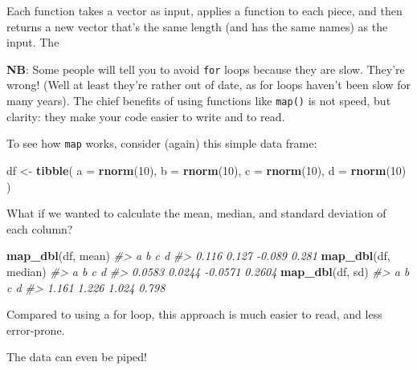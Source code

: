 \documentclass[]{book}
\newenvironment{Shaded}{\begin{snugshade}}{\end{snugshade}}
\newcommand{\KeywordTok}[1]{\textcolor[rgb]{0.13,0.29,0.53}{\textbf{#1}}}
\newcommand{\DataTypeTok}[1]{\textcolor[rgb]{0.13,0.29,0.53}{#1}}
\newcommand{\DecValTok}[1]{\textcolor[rgb]{0.00,0.00,0.81}{#1}}
\newcommand{\StringTok}[1]{\textcolor[rgb]{0.31,0.60,0.02}{#1}}
\newcommand{\CommentTok}[1]{\textcolor[rgb]{0.56,0.35,0.01}{\textit{#1}}}
\newcommand{\OperatorTok}[1]{\textcolor[rgb]{0.81,0.36,0.00}{\textbf{#1}}}
\newcommand{\NormalTok}[1]{#1}
\begin{document}
Each function takes a vector as input, applies a function to each piece,
and then returns a new vector that's the same length (and has the same
names) as the input. The

\textbf{NB}: Some people will tell you to avoid \texttt{for} loops
because they are slow. They're wrong! (Well at least they're rather out
of date, as for loops haven't been slow for many years). The chief
benefits of using functions like \texttt{map()} is not speed, but
clarity: they make your code easier to write and to read.

To see how \texttt{map} works, consider (again) this simple data frame:

\begin{Shaded}
\begin{Highlighting}[]
\NormalTok{df <-}\StringTok{ }\KeywordTok{tibble}\NormalTok{(}
  \DataTypeTok{a =} \KeywordTok{rnorm}\NormalTok{(}\DecValTok{10}\NormalTok{),}
  \DataTypeTok{b =} \KeywordTok{rnorm}\NormalTok{(}\DecValTok{10}\NormalTok{),}
  \DataTypeTok{c =} \KeywordTok{rnorm}\NormalTok{(}\DecValTok{10}\NormalTok{),}
  \DataTypeTok{d =} \KeywordTok{rnorm}\NormalTok{(}\DecValTok{10}\NormalTok{)}
\NormalTok{)}
\end{Highlighting}
\end{Shaded}

What if we wanted to calculate the mean, median, and standard deviation
of each column?

\begin{Shaded}
\begin{Highlighting}[]
\KeywordTok{map_dbl}\NormalTok{(df, mean)}
\CommentTok{#>      a      b      c      d }
\CommentTok{#>  0.116  0.127 -0.089  0.281}
\KeywordTok{map_dbl}\NormalTok{(df, median)}
\CommentTok{#>       a       b       c       d }
\CommentTok{#>  0.0583  0.0244 -0.0571  0.2604}
\KeywordTok{map_dbl}\NormalTok{(df, sd)}
\CommentTok{#>     a     b     c     d }
\CommentTok{#> 1.161 1.226 1.024 0.798}
\end{Highlighting}
\end{Shaded}

Compared to using a for loop, this approach is much easier to read, and
less error-prone.

The data can even be piped!

\begin{Shaded}
\end{Shaded}
\end{document}
